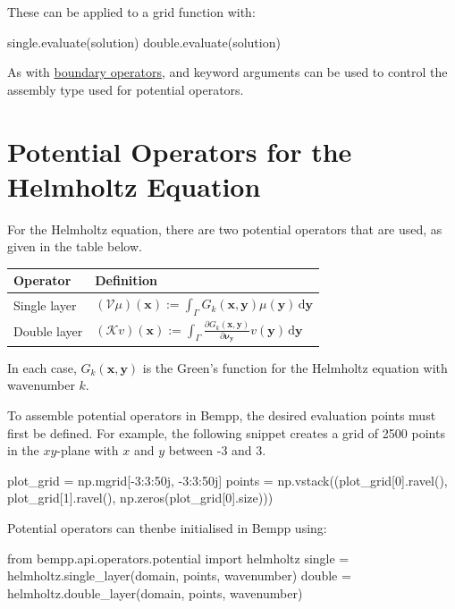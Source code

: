 \documentclass[a4paper]{book}
\begin{document}
These can be applied to a grid function with:
\begin{python}
single.evaluate(solution)
double.evaluate(solution)
\end{python}

As with \href{laplace_boundary_operators.md}{boundary operators},  and 
keyword arguments can be used to control the assembly type used for potential operators.


\section{Potential Operators for the Helmholtz Equation}

For the Helmholtz equation, there are two potential operators that are used, as given in the table
below.

\begin{center}
\begin{tabular}{|l|l|}
\hline
Operator             & Definition\\
\hline
Single layer         & $\displaystyle (\mathcal{V}\mu)(\mathbf{x}) := \int_{\Gamma} G_k(\mathbf{x},\mathbf{y}) \mu(\mathbf{y})\,\mathrm{d}\mathbf{y}$\\
Double layer         & $\displaystyle (\mathcal{K}v)(\mathbf{x}) := \int_{\Gamma} \frac{\partial G_k(\mathbf{x},\mathbf{y})}{\partial\mathbf{\nu}_{\mathbf{y}}} v(\mathbf{y})\,\mathrm{d}\mathbf{y}$\\
\hline
\end{tabular}
\end{center}

In each case, $G_k(\mathbf{x},\mathbf{y})$ is the Green's function for the Helmholtz equation
with wavenumber $k$.

To assemble potential operators in Bempp, the desired evaluation points must first be defined.
For example, the following snippet creates a grid of 2500 points in the $x$$y$-plane with
$x$ and $y$ between -3 and 3.

\begin{python}
plot_grid = np.mgrid[-3:3:50j, -3:3:50j]
points = np.vstack((plot_grid[0].ravel(),
                    plot_grid[1].ravel(),
                    np.zeros(plot_grid[0].size)))
\end{python}

Potential operators can thenbe initialised in Bempp using:
\begin{python}
from bempp.api.operators.potential import helmholtz
single = helmholtz.single_layer(domain, points, wavenumber)
double = helmholtz.double_layer(domain, points, wavenumber)
\end{python}
\end{document}
